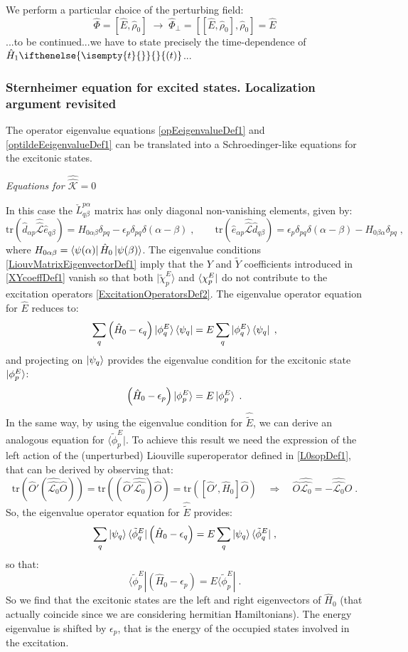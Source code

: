 \documentclass[a4paper]{article}
\newcommand{\eps}{\epsilon}
\newcommand{\be}{\begin{equation}}
\newcommand{\ee}{\end{equation}}
\newcommand{\qq}{\qquad}
\newcommand{\lb}{\label}
\newcommand{\op}[1]{\hat {#1}}
\newcommand{\sop}[1]{\op{\op {#1}}}
\newcommand{\commutator}[2]{\left[ {#1} , {#2} \right]}
\newcommand{\trace}[1]{\mathrm{tr}\left(#1\right)}
\newcommand{\argument}[1]{\ifthenelse{\isempty{#1}{}}{}{(#1)}}
\newcommand{\optr}[1]{\check #1}
\newcommand{\opskew}[1]{{\op {#1}}_{\perp}}
\newcommand{\tket}[1]{| \tilde #1 \rangle}
\newcommand{\tbra}[1]{\langle \tilde #1 |}
\newcommand{\dmnot}{\op{\rho}_0}
\newcommand{\hnot}{\op{H}_0}
\newcommand{\hone}[1]{\op{H}_1\argument{#1}}
\newcommand{\excite}[2]{\op e_{{#1}{#2}}}
\newcommand{\decay}[2]{\op d_{{#1}{#2}}}
\newcommand{\Liouv}{\sop{\mathcal L}}
\newcommand{\Liouvnot}{\sop{\mathcal L_0}}
\newcommand{\coupl}{\sop{\mathcal K}}
\begin{document}
We perform a particular choice of the perturbing field:
\be
\op\Phi = \commutator{\op E}{\dmnot} \; \longrightarrow \; \opskew{\Phi} = 
\commutator{\commutator{\op E}{\dmnot}}{\dmnot} = \op E
\ee
...to be continued...we have to state precisely the time-dependence of $\hone{t}$...

\subsubsection{Sternheimer equation for excited states. Localization argument revisited}

The operator eigenvalue equations \eqref{opEeigenvalueDef1} and \eqref{optildeEeigenvalueDef1} can be translated into a Schroedinger-like equations
for the excitonic states. 

\vspace{0.5cm}
\emph{Equations for $\coupl = 0$}
\vspace{0.5cm}

\noindent In this case the $\optr{L}_{q\beta}^{p\alpha}$ matrix has only diagonal non-vanishing elements, given by: 
\be
\trace{\decay{\alpha}{p}\Liouv\excite{q}{\beta}} = H_{0\alpha\beta}\delta_{pq} - \eps_p\delta_{pq}\delta(\alpha-\beta) \;, \qq
\trace{\excite{\alpha}{p}\Liouv\decay{q}{\beta}} = \eps_p\delta_{pq}\delta(\alpha-\beta) - H_{0\beta\alpha}\delta_{pq} \;, 
\ee
where $H_{0\alpha\beta} = \bra{\psi(\alpha)}\hnot\ket{\psi(\beta)}$. The eigenvalue conditions \eqref{LiouvMatrixEigenvectorDef1} imply
that the $Y$ and $\tilde Y$ coefficients introduced in \eqref{XYcoeffDef1} vanish so that both $\tket{\chi^E_p}$ and $\bra{\chi^E_p}$ do not
contribute to the excitation operators \eqref{ExcitationOperatorsDef2}. The eigenvalue operator equation for $\op E$ reduces to:
\be
\sum_q\left(\hnot - \eps_q\right)\ket{\phi^E_q}\bra{\psi_q} = E \sum_q \ket{\phi^E_q}\bra{\psi_q} \;,
\ee
and projecting on $\ket{\psi_q}$ provides the eigenvalue condition for the excitonic state $\ket{\phi^E_p}$:
\be
\left(\hnot - \eps_p\right)\ket{\phi^E_p} = E \ket{\phi^E_p} \;.
\ee
In the same way, by using the eigenvalue condition for $\op{\tilde E}$, we can derive an analogous equation for $\tbra{\phi^E_p}$. To achieve this
result we need the expression of the left action of the (unperturbed) Liouville superoperator defined in \eqref{L0sopDef1}, that can be derived by
observing that:
\be\lb{leftActionLouv0Def1}
\trace{\op O' (\Liouvnot \op O)} = \trace{(\op O' \Liouvnot) \op O } =
\trace{\commutator{\op O'}{\op H_0} \op O} \quad \Rightarrow \quad \op O \Liouvnot = 
- \Liouvnot \op O \;.
\ee
So, the eigenvalue operator equation for $\op{\tilde E}$ provides:
\be
\sum_q  \ket{\psi_q} \tbra{\phi^E_q} \left( \hnot - \eps_q \right) =
E \sum_q  \ket{\psi_q} \tbra{\phi^E_q} \;,
\ee
so that:
\be
\tbra{\phi^E_p} \left( \hnot - \eps_p \right) = E \tbra{\phi^E_p} \;.
\ee
So we find that the excitonic states are the left and right eigenvectors of $\hnot$ (that actually coincide since we are considering
hermitian Hamiltonians). The energy eigenvalue is shifted by $\eps_p$, that is the energy of the occupied states involved in the 
excitation. 
\end{document}

